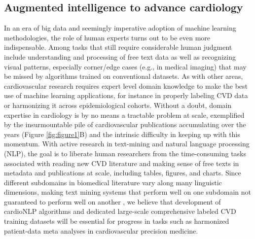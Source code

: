 \documentclass[letter]{bioinfo}
\begin{document}
	
	\subsection*{Augmented intelligence to advance cardiology}
	In an era of big data and seemingly imperative adoption of machine learning methodologies, the role of human experts turns out to be even more indispensable. Among tasks that still require considerable human judgment include understanding and processing of free text data as well as recognizing visual patterns, especially corner/edge cases (e.g., in medical imaging) that may be missed by algorithms trained on conventional datasets.  As with other areas, cardiovascular research requires expert level domain knowledge to make the best use of machine learning applications, for instance in properly labeling CVD data or harmonizing it across epidemiological cohorts.  Without a doubt, domain expertise in cardiology is by no means a tractable problem at scale, exemplified by the insurmountable pile of cardiovascular publications accumulating over the years (Figure \ref{fig:figure1}B) and the intrinsic difficulty in keeping up with this momentum.  With active research in text-mining and natural language processing (NLP), the goal is to liberate human researchers from the time-consuming tasks associated with reading new CVD literature and making sense of free texts in metadata and publications at scale, including tables, figures, and charts. Since different subdomains in biomedical literature vary along many linguistic dimensions, making text mining systems that perform well on one subdomain not guaranteed to perform well on another \citep{Lippincott:2011:Exploring, Kilicoglu:2018:Biomedical, Khomtchouk:2018:Biochat}, we believe that development of cardioNLP algorithms and dedicated large-scale comprehensive labeled CVD training datasets will be essential for progress in tasks such as harmonized patient-data meta analyses in cardiovascular precision medicine.  
	
\end{document}
